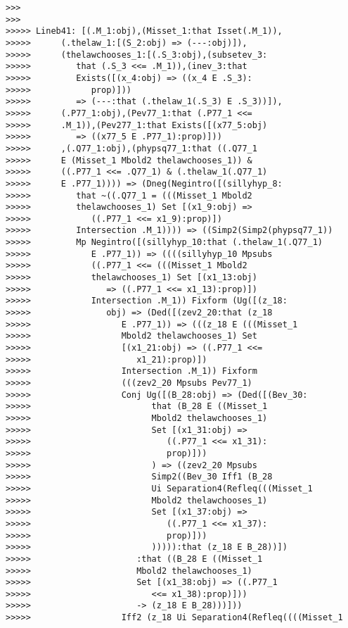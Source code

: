 \documentclass[12pt]{article}
\begin{document}
\begin{verbatim}
>>>
>>>
>>>>> Lineb41: [(.M_1:obj),(Misset_1:that Isset(.M_1)),
>>>>>      (.thelaw_1:[(S_2:obj) => (---:obj)]),
>>>>>      (thelawchooses_1:[(.S_3:obj),(subsetev_3:
>>>>>         that (.S_3 <<= .M_1)),(inev_3:that
>>>>>         Exists([(x_4:obj) => ((x_4 E .S_3):
>>>>>            prop)]))
>>>>>         => (---:that (.thelaw_1(.S_3) E .S_3))]),
>>>>>      (.P77_1:obj),(Pev77_1:that (.P77_1 <<=
>>>>>      .M_1)),(Pev277_1:that Exists([(x77_5:obj)
>>>>>         => ((x77_5 E .P77_1):prop)]))
>>>>>      ,(.Q77_1:obj),(phypsq77_1:that ((.Q77_1
>>>>>      E (Misset_1 Mbold2 thelawchooses_1)) &
>>>>>      ((.P77_1 <<= .Q77_1) & (.thelaw_1(.Q77_1)
>>>>>      E .P77_1)))) => (Dneg(Negintro([(sillyhyp_8:
>>>>>         that ~((.Q77_1 = (((Misset_1 Mbold2
>>>>>         thelawchooses_1) Set [(x1_9:obj) =>
>>>>>            ((.P77_1 <<= x1_9):prop)])
>>>>>         Intersection .M_1)))) => ((Simp2(Simp2(phypsq77_1))
>>>>>         Mp Negintro([(sillyhyp_10:that (.thelaw_1(.Q77_1)
>>>>>            E .P77_1)) => ((((sillyhyp_10 Mpsubs
>>>>>            ((.P77_1 <<= (((Misset_1 Mbold2
>>>>>            thelawchooses_1) Set [(x1_13:obj)
>>>>>               => ((.P77_1 <<= x1_13):prop)])
>>>>>            Intersection .M_1)) Fixform (Ug([(z_18:
>>>>>               obj) => (Ded([(zev2_20:that (z_18
>>>>>                  E .P77_1)) => (((z_18 E (((Misset_1
>>>>>                  Mbold2 thelawchooses_1) Set
>>>>>                  [(x1_21:obj) => ((.P77_1 <<=
>>>>>                     x1_21):prop)])
>>>>>                  Intersection .M_1)) Fixform
>>>>>                  (((zev2_20 Mpsubs Pev77_1)
>>>>>                  Conj Ug([(B_28:obj) => (Ded([(Bev_30:
>>>>>                        that (B_28 E ((Misset_1
>>>>>                        Mbold2 thelawchooses_1)
>>>>>                        Set [(x1_31:obj) =>
>>>>>                           ((.P77_1 <<= x1_31):
>>>>>                           prop)]))
>>>>>                        ) => ((zev2_20 Mpsubs
>>>>>                        Simp2((Bev_30 Iff1 (B_28
>>>>>                        Ui Separation4(Refleq(((Misset_1
>>>>>                        Mbold2 thelawchooses_1)
>>>>>                        Set [(x1_37:obj) =>
>>>>>                           ((.P77_1 <<= x1_37):
>>>>>                           prop)]))
>>>>>                        ))))):that (z_18 E B_28))])
>>>>>                     :that ((B_28 E ((Misset_1
>>>>>                     Mbold2 thelawchooses_1)
>>>>>                     Set [(x1_38:obj) => ((.P77_1
>>>>>                        <<= x1_38):prop)]))
>>>>>                     -> (z_18 E B_28)))]))
>>>>>                  Iff2 (z_18 Ui Separation4(Refleq((((Misset_1

\end{verbatim}
\end{document}
